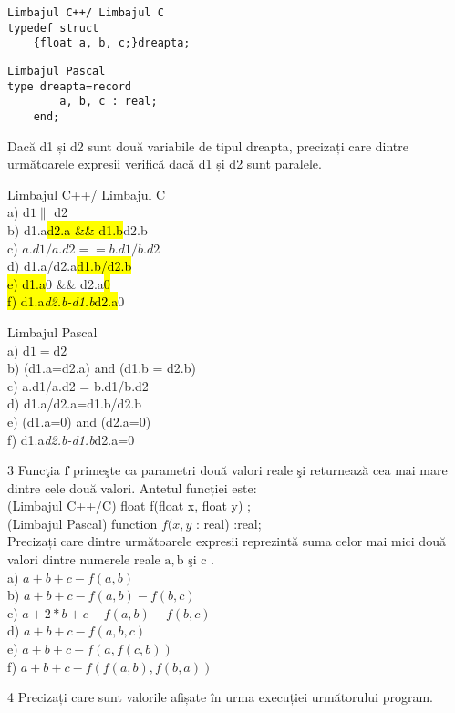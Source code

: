 \begin{verbatim}
Limbajul C++/ Limbajul C
typedef struct
    {float a, b, c;}dreapta;
\end{verbatim}

\begin{verbatim}
Limbajul Pascal
type dreapta=record
        a, b, c : real;
    end;
\end{verbatim}

Dacă d1 și d2 sunt două variabile de tipul dreapta, precizați care dintre următoarele expresii verifică dacă d1 și d2 sunt paralele.

Limbajul C++/ Limbajul C\\
a) $\mathrm{d} 1 \mathrm{\|}$ d2\\
b) d1.a\hl{d2.a \&\& d1.b}d2.b\\
c) $a . d 1 / a . d 2==b . d 1 / b . d 2$\\
d) d1.a/d2.a\hl{d1.b/d2.b\\
e) d1.a}0 \&\& d2.a\hl{0\\
f) d1.a\textit{d2.b-d1.b}d2.a}0

Limbajul Pascal\\
a) $\mathrm{d} 1=\mathrm{d} 2$\\
b) (d1.a=d2.a) and (d1.b = d2.b)\\
c) a.d1/a.d2 = b.d1/b.d2\\
d) d1.a/d2.a=d1.b/d2.b\\
e) (d1.a=0) and (d2.a=0)\\
f) d1.a\textit{d2.b-d1.b}d2.a=0

3 Funcţia $\mathbf{f}$ primeşte ca parametri două valori reale şi returnează cea mai mare dintre cele două valori. Antetul funcției este:\\
(Limbajul C++/C) float f(float x, float y) ;\\
(Limbajul Pascal) function $f(x, y$ : real) :real;\\
Precizați care dintre următoarele expresii reprezintă suma celor mai mici două valori dintre numerele reale $\mathrm{a}, \mathrm{b}$ şi c .\\
a) $a+b+c-f(a, b)$\\
b) $a+b+c-f(a, b)-f(b, c)$\\
c) $a+2 * b+c-f(a, b)-f(b, c)$\\
d) $a+b+c-f(a, b, c)$\\
e) $a+b+c-f(a, f(c, b))$\\
f) $a+b+c-f(f(a, b), f(b, a))$

4 Precizați care sunt valorile afișate în urma execuției următorului program.

